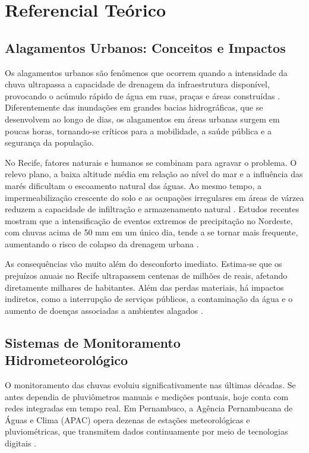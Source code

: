 \chapter{Referencial Teórico}

\section{Alagamentos Urbanos: Conceitos e Impactos}

Os alagamentos urbanos são fenômenos que ocorrem quando a intensidade da chuva ultrapassa a capacidade de drenagem da infraestrutura disponível, provocando o acúmulo rápido de água em ruas, praças e áreas construídas \cite{carvalho2025sistema}. Diferentemente das inundações em grandes bacias hidrográficas, que se desenvolvem ao longo de dias, os alagamentos em áreas urbanas surgem em poucas horas, tornando-se críticos para a mobilidade, a saúde pública e a segurança da população.

No Recife, fatores naturais e humanos se combinam para agravar o problema. O relevo plano, a baixa altitude média em relação ao nível do mar e a influência das marés dificultam o escoamento natural das águas. Ao mesmo tempo, a impermeabilização crescente do solo e as ocupações irregulares em áreas de várzea reduzem a capacidade de infiltração e armazenamento natural \cite{domingos2025mapeamento}. Estudos recentes mostram que a intensificação de eventos extremos de precipitação no Nordeste, com chuvas acima de 50 mm em um único dia, tende a se tornar mais frequente, aumentando o risco de colapso da drenagem urbana \cite{wilson2016analise}.

As consequências vão muito além do desconforto imediato. Estima-se que os prejuízos anuais no Recife ultrapassem centenas de milhões de reais, afetando diretamente milhares de habitantes. Além das perdas materiais, há impactos indiretos, como a interrupção de serviços públicos, a contaminação da água e o aumento de doenças associadas a ambientes alagados \cite{carvalho2025sistema}.

\section{Sistemas de Monitoramento Hidrometeorológico}

O monitoramento das chuvas evoluiu significativamente nas últimas décadas. Se antes dependia de pluviômetros manuais e medições pontuais, hoje conta com redes integradas em tempo real. Em Pernambuco, a Agência Pernambucana de Águas e Clima (APAC) opera dezenas de estações meteorológicas e pluviométricas, que transmitem dados continuamente por meio de tecnologias digitais \cite{alves_apac}.  

